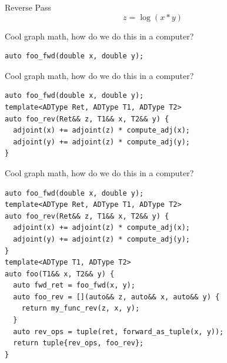\documentclass[dvipsnames]{beamer}
\makeatletter
\def\mathcolor#1#{\@mathcolor{#1}}
\def\@mathcolor#1#2#3{%
  \protect\leavevmode
  \begingroup
    \color#1{#2}#3%
  \endgroup
}
\newcommand{\pp}[2]{\frac{\partial#1}{\partial#2}}
\newcommand{\adj}[1]{\bar{#1}}
\makeatother
\begin{document}
\begin{frame}{Reverse Pass}
\vspace{-1mm}
$$z = \log(x*y)$$
\end{frame}


\begin{frame}[fragile]{Cool graph math, how do we do this in a computer?}
\begin{verbatim}
auto foo_fwd(double x, double y);
\end{verbatim}
\end{frame}

\begin{frame}[fragile]{Cool graph math, how do we do this in a computer?}
\begin{verbatim}
auto foo_fwd(double x, double y);
template<ADType Ret, ADType T1, ADType T2>
auto foo_rev(Ret&& z, T1&& x, T2&& y) {
  adjoint(x) += adjoint(z) * compute_adj(x);
  adjoint(y) += adjoint(z) * compute_adj(y);
}
\end{verbatim}
\end{frame}

\begin{frame}[fragile]{Cool graph math, how do we do this in a computer?}
\begin{verbatim}
auto foo_fwd(double x, double y);
template<ADType Ret, ADType T1, ADType T2>
auto foo_rev(Ret&& z, T1&& x, T2&& y) {
  adjoint(x) += adjoint(z) * compute_adj(x);
  adjoint(y) += adjoint(z) * compute_adj(y);
}
template<ADType T1, ADType T2>
auto foo(T1&& x, T2&& y) {
  auto fwd_ret = foo_fwd(x, y);
  auto foo_rev = [](auto&& z, auto&& x, auto&& y) {
    return my_func_rev(z, x, y);
  }
  auto rev_ops = tuple(ret, forward_as_tuple(x, y));
  return tuple{rev_ops, foo_rev};
}
\end{verbatim}
\end{frame}
\end{document}
